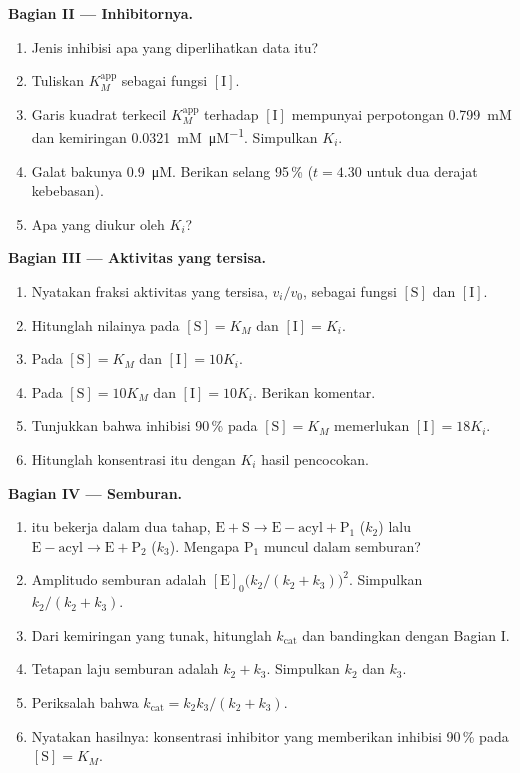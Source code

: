 \begin{problem}
\medskip\noindent\textbf{Bagian II --- Inhibitornya.}
\begin{enumerate}[resume, beginpenalty=10000]
  \item Jenis inhibisi apa yang diperlihatkan data itu?
  \item Tuliskan $K_M^{\mathrm{app}}$ sebagai fungsi $[\mathrm I]$.
  \item Garis kuadrat terkecil $K_M^{\mathrm{app}}$ terhadap $[\mathrm I]$ mempunyai
        perpotongan \qty{0.799}{mM} dan kemiringan \qty{0.0321}{mM.\micro M^{-1}}.
        Simpulkan $K_i$.
  \item Galat bakunya \qty{0.9}{\micro M}. Berikan selang 95\,\% ($t = 4.30$ untuk
        dua derajat kebebasan).
  \item Apa yang diukur oleh $K_i$?
\end{enumerate}

\medskip\noindent\textbf{Bagian III --- Aktivitas yang tersisa.}
\begin{enumerate}[resume, beginpenalty=10000]
  \item Nyatakan fraksi aktivitas yang tersisa, $v_i/v_0$, sebagai fungsi
        $[\mathrm S]$ dan $[\mathrm I]$.
  \item Hitunglah nilainya pada $[\mathrm S] = K_M$ dan $[\mathrm I] = K_i$.
  \item Pada $[\mathrm S] = K_M$ dan $[\mathrm I] = 10K_i$.
  \item Pada $[\mathrm S] = 10K_M$ dan $[\mathrm I] = 10K_i$. Berikan komentar.
  \item Tunjukkan bahwa inhibisi 90\,\% pada $[\mathrm S] = K_M$ memerlukan
        $[\mathrm I] = 18K_i$.
  \item Hitunglah konsentrasi itu dengan $K_i$ hasil pencocokan.
\end{enumerate}

\medskip\noindent\textbf{Bagian IV --- Semburan.}
\begin{enumerate}[resume, beginpenalty=10000]
  \item {} itu bekerja dalam dua tahap, $\mathrm{E + S \to E{-}acyl + P_1}$ ($k_2$)
        lalu $\mathrm{E{-}acyl \to E +
        P_2}$ ($k_3$). Mengapa $\mathrm P_1$ muncul dalam semburan?
  \item Amplitudo semburan adalah $[\mathrm E]_0\bigl(k_2/(k_2 + k_3)\bigr)^2$.
        Simpulkan $k_2/(k_2 + k_3)$.
  \item Dari kemiringan yang tunak, hitunglah $k_{\mathrm{cat}}$ dan bandingkan dengan
        Bagian I.
  \item Tetapan laju semburan adalah $k_2 + k_3$. Simpulkan $k_2$ dan $k_3$.
  \item Periksalah bahwa $k_{\mathrm{cat}} = k_2k_3/(k_2 + k_3)$.
  \item Nyatakan hasilnya: konsentrasi inhibitor yang memberikan inhibisi
        90\,\% pada $[\mathrm S] = K_M$.
\end{enumerate}
\end{problem}
